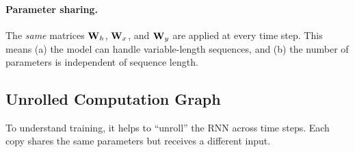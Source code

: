 \paragraph{Parameter sharing.}
The \emph{same} matrices $\mathbf{W}_h$, $\mathbf{W}_x$, and $\mathbf{W}_y$ are applied at every
time step.  This means (a) the model can handle variable-length sequences, and
(b) the number of parameters is independent of sequence length.

\subsection{Unrolled Computation Graph}

To understand training, it helps to ``unroll'' the RNN across time steps.
Each copy shares the same parameters but receives a different input.

